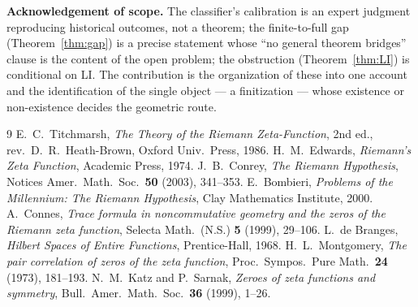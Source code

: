 \documentclass[11pt]{amsart}
\theoremstyle{definition}
\theoremstyle{remark}
\begin{document}
\smallskip
\noindent\textbf{Acknowledgement of scope.} The classifier's calibration is an
expert judgment reproducing historical outcomes, not a theorem; the
finite-to-full gap (Theorem~\ref{thm:gap}) is a precise statement whose
``no general theorem bridges'' clause is the content of the open problem; the
obstruction (Theorem~\ref{thm:LI}) is conditional on LI. The contribution is
the organization of these into one account and the identification of the single
object --- a finitization --- whose existence or non-existence decides the
geometric route.

\begin{thebibliography}{9}
 E.~C.~Titchmarsh, \emph{The Theory of the Riemann Zeta-Function}, 2nd ed., rev.\ D.~R.~Heath-Brown, Oxford Univ.\ Press, 1986.
 H.~M.~Edwards, \emph{Riemann's Zeta Function}, Academic Press, 1974.
 J.~B.~Conrey, \emph{The Riemann Hypothesis}, Notices Amer.\ Math.\ Soc.\ \textbf{50} (2003), 341--353.
 E.~Bombieri, \emph{Problems of the Millennium: The Riemann Hypothesis}, Clay Mathematics Institute, 2000.
 A.~Connes, \emph{Trace formula in noncommutative geometry and the zeros of the Riemann zeta function}, Selecta Math.\ (N.S.) \textbf{5} (1999), 29--106.
 L.~de Branges, \emph{Hilbert Spaces of Entire Functions}, Prentice-Hall, 1968.
 H.~L.~Montgomery, \emph{The pair correlation of zeros of the zeta function}, Proc.\ Sympos.\ Pure Math.\ \textbf{24} (1973), 181--193.
 N.~M.~Katz and P.~Sarnak, \emph{Zeroes of zeta functions and symmetry}, Bull.\ Amer.\ Math.\ Soc.\ \textbf{36} (1999), 1--26.
\end{thebibliography}
\end{document}

